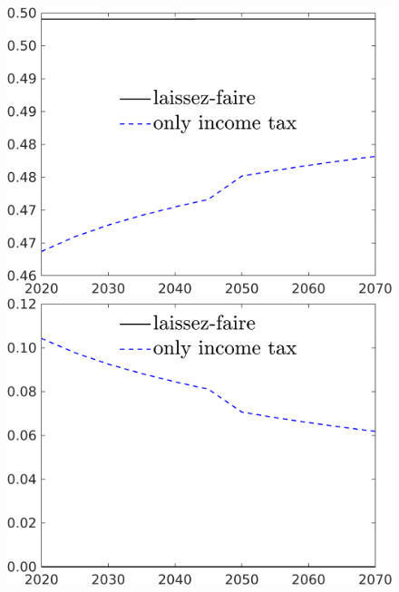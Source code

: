 \begin{figure}[h!!]
\begin{minipage}[]{0.32\textwidth}
\end{minipage}
\begin{minipage}[]{0.32\textwidth}
\includegraphics[width=1\textwidth]{../../codding_model/own_basedOnFried/optimalPol_190722_tidiedUp/figures/all_10Aout22/CountTaul_modtest_target_hh_spillover0_sep1_extern0_PV1_etaa0.79_lgd1.png}
\end{minipage}
\begin{minipage}[]{0.32\textwidth}
\includegraphics[width=1\textwidth]{../../codding_model/own_basedOnFried/optimalPol_190722_tidiedUp/figures/all_10Aout22/CountTaul_modtest_target_taul_spillover0_sep1_extern0_PV1_etaa0.79_lgd1.png}
\end{minipage}
\end{figure} 


